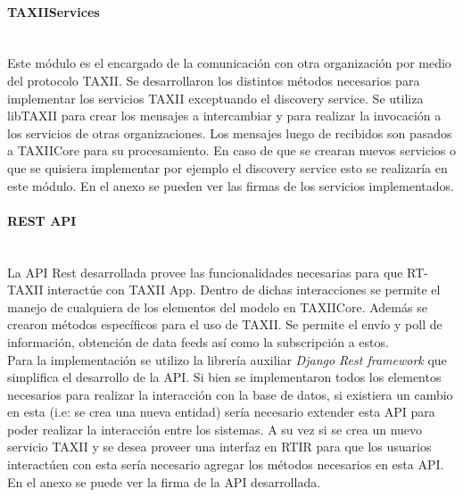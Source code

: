 \paragraph{TAXIIServices}\ \\
Este módulo es el encargado de la comunicación con otra organización por medio del protocolo TAXII. Se desarrollaron  los distintos métodos necesarios para implementar los servicios TAXII exceptuando el discovery service.
Se utiliza libTAXII para crear los mensajes a intercambiar y para realizar la invocación a los servicios de otras organizaciones.
Los mensajes luego de recibidos son pasados a TAXIICore para su procesamiento.
En caso de que se crearan nuevos servicios o que se quisiera implementar por ejemplo el discovery service esto se realizaría en este módulo.
En el anexo se pueden ver las firmas de los servicios implementados.

\paragraph{REST API}\ \\
La API Rest desarrollada provee las funcionalidades necesarias para que RT-TAXII interactúe con TAXII App. Dentro de dichas interacciones se permite el manejo de cualquiera de los elementos del modelo en TAXIICore. Además se crearon métodos específicos para el uso de TAXII. Se permite el envío y poll de información, obtención de data feeds así como la subscripción a estos.\\

Para la implementación se utilizo la librería auxiliar \textit{Django Rest framework} que simplifica el desarrollo de la API.
Si bien se implementaron todos los elementos necesarios para realizar la interacción con la base de datos, si existiera un cambio en esta (i.e: se crea una nueva entidad) sería necesario extender esta API para poder realizar la interacción entre los sistemas. A su vez si se crea un nuevo servicio TAXII y se desea proveer una interfaz en RTIR para que los usuarios interactúen con esta sería necesario agregar los métodos necesarios en esta API.
En el anexo se puede ver la firma de la API desarrollada.
